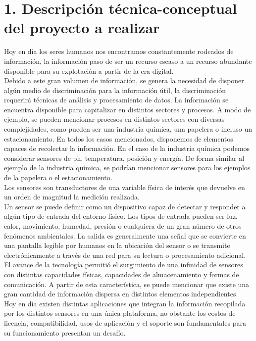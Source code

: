 \documentclass[
11pt, %
]{charter}
\begin{document}
\section{1. Descripción técnica-conceptual del proyecto a realizar}
\label{sec:descripcion}

Hoy en día los seres humanos nos encontramos constantemente rodeados de información, la información paso de ser un recurso escaso a un recurso abundante disponible para su explotación a partir de la era digital.\\
Debido a este gran volumen de información, se genera la necesidad de disponer algún medio de discriminación para la información útil, la discriminación requerirá técnicas de análisis y procesamiento de datos. 
La información se encuentra disponible para capitalizar en distintos sectores y procesos. 
A modo de ejemplo, se pueden mencionar procesos en distintos sectores con diversas complejidades, como pueden ser una industria química, una papelera o incluso un estacionamiento.
En todos los casos mencionados, disponemos de elementos capaces de recolectar la información. En el caso de la industria química podemos considerar sensores de ph, temperatura, posición y energía. De forma similar al ejemplo de la industria química, se podrían mencionar sensores para los ejemplos de la papelera o el estacionamiento.\\
Los sensores son transductores de una variable física de interés que devuelve en un orden de magnitud la medición realizada. \\ 
Un sensor se puede definir como un dispositivo capaz de detectar y responder a algún tipo de entrada del entorno físico. Los tipos de entrada pueden ser luz, calor, movimiento, humedad, presión o cualquiera de un gran número de otros fenómenos ambientales. La salida es generalmente una señal que se convierte en una pantalla legible por humanos en la ubicación del sensor o se transmite electrónicamente a través de una red para su lectura o procesamiento adicional. 
El avance de la tecnología permitió el surgimiento de una infinidad de sensores con distintas capacidades físicas, capacidades de almacenamiento y formas de comunicación. A partir de esta característica, se puede mencionar que existe una gran cantidad de información dispersa en distintos elementos independientes.\\
 Hoy en día existen distintas aplicaciones que integran la información recopilada por los distintos sensores en una única plataforma, no obstante los costos de licencia, compatibilidad, usos de aplicación y el soporte son fundamentales para su funcionamiento presentan un desafío.\\
\end{document}
